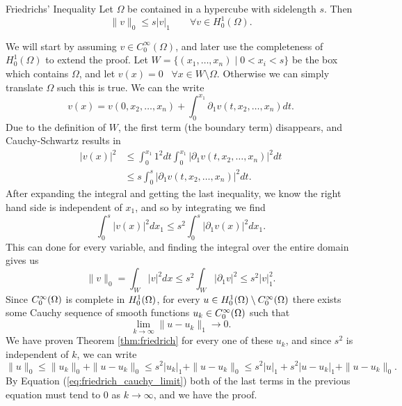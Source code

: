 \begin{thmx}{Friedrichs' Inequality}
Let $\Omega$ be contained in a hypercube with sidelength $s$. Then 
\begin{equation*}
    \| v \|_0 \leq s |v|_1 \quad \quad \forall v \in H_0^1(\Omega).
\end{equation*}
\label{thm:friedrich}
\end{thmx}
\begin{bev}
We will start by assuming $v \in C_0^{\infty}(\Omega)$, and later use the 
completeness of $H_0^1(\Omega)$ to extend the proof.
Let $W = \{ (x_1, \ldots, x_n) \mid 0 < x_i < s \}$ be the box 
which contains $\Omega$, and let $v(x)=0$ \, $\forall x
\in W\setminus \Omega$. Otherwise we can simply translate $\Omega$ such 
this is true.
 We can the write 
\begin{equation*}
v(x)=v(0, x_2, \ldots, x_n) + \int_{0}^{x_1} \partial _1 v(t,x_2, \ldots, x_n) dt.
\end{equation*}
Due to the definition of $W$, the first term (the boundary term) 
disappears, and Cauchy-Schwartz results in 
\begin{align*}
    |v(x)|^2 &\leq \int_{0}^{x_1} 1^2 dt \int_{0}^{x_1}|\partial_1 v(t, x_2, \ldots, x_n)|^2 dt \\ 
    &\leq s \int_{0}^{s}|\partial_1 v(t, x_2, \ldots, x_n)|^2 dt. 
\end{align*}
After expanding the integral and getting the last inequality, we know 
the right hand side is independent of $x_1$, and so by integrating we find 
\begin{equation*}
    \int_{0}^{s}|v(x)|^2dx_1 \leq s^2\int_{0}^{s}|\partial _1 v(x)|^2dx_1.
\end{equation*}
This can done for every variable, and finding the integral over the entire 
domain gives us 
\begin{equation*}
    \|v\|_0 = \int_{W}|v|^2 dx \leq s^2 \int_{W} |\partial _1v|^2 \leq s^2 |v|_1^2.
\end{equation*}
Since $C^\infty_0(\Omega)$ is complete in $H_0^1(\Omega)$, for every $u \in H_0^1(\Omega)\setminus C^\infty_0(\Omega)$
there exists some Cauchy sequence of smooth functions $u_k \in C^\infty_0(\Omega)$
 such that 
\begin{equation}
    \lim_{k \to \infty} \| u-u_k\|_1 \to 0.
    \label{eq:friedrich_cauchy_limit}
\end{equation}
We have proven Theorem \ref*{thm:friedrich} for every one of these $u_k$, and 
since $s^2$ is independent of $k$, we can write 
\begin{equation*}
    \|u\|_0 \leq \|u_k\|_0 + \|u-u_k\|_0 \leq  s^2|u_k|_1 +  \|u-u_k\|_0 \leq s^2|u|_1 + s^2|u-u_k|_1 + \|u-u_k\|_0.
\end{equation*}
By Equation (\ref*{eq:friedrich_cauchy_limit}) both of the last terms in the 
previous equation must tend to $0$ as $k \to \infty$, and we have the proof.
\end{bev}